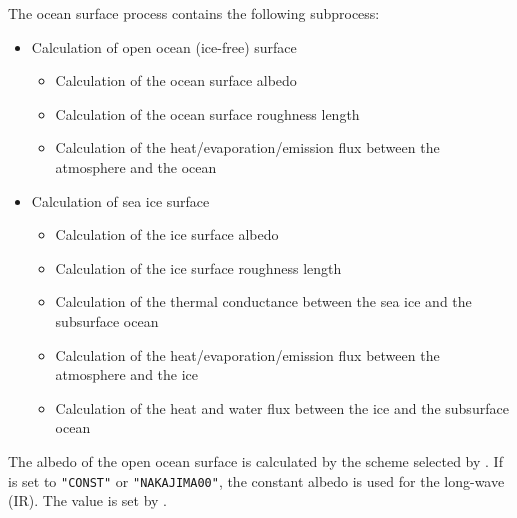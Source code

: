 The ocean surface process contains the following subprocess:

\begin{itemize}
   \item Calculation of open ocean (ice-free) surface
   \begin{itemize}
      \item Calculation of the ocean surface albedo
      \item Calculation of the ocean surface roughness length
      \item Calculation of the heat/evaporation/emission flux between the atmosphere and the ocean
   \end{itemize}

   \item Calculation of sea ice surface
   \begin{itemize}
      \item Calculation of the ice surface albedo
      \item Calculation of the ice surface roughness length
      \item Calculation of the thermal conductance between the sea ice and the subsurface ocean
      \item Calculation of the heat/evaporation/emission flux between the atmosphere and the ice
      \item Calculation of the heat and water flux between the ice and the subsurface ocean
   \end{itemize}
\end{itemize}



The albedo of the open ocean surface is calculated by the scheme selected by .
If  is set to \verb|"CONST"| or \verb|"NAKAJIMA00"|, the constant albedo is used for the long-wave (IR).
The value is set by .


